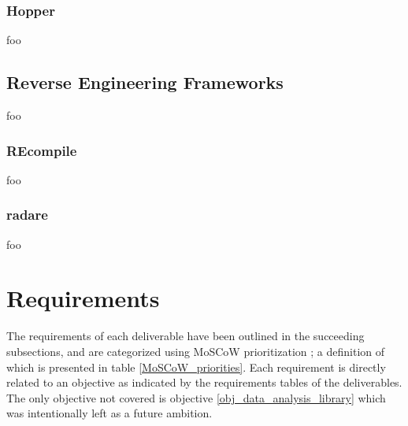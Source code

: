 \documentclass[12pt, a4paper]{article}
\begin{document}

\subsubsection{Hopper}


foo


\subsection{Reverse Engineering Frameworks}

foo


\subsubsection{REcompile}

foo

\cite{recompile}


\subsubsection{radare}

foo

\cite{radare}

\pagebreak



\section{Requirements}

The requirements of each deliverable have been outlined in the succeeding subsections, and are categorized using MoSCoW prioritization \cite{MoSCoW_analysis}; a definition of which is presented in table \ref{MoSCoW_priorities}. Each requirement is directly related to an objective as indicated by the requirements tables of the deliverables. The only objective not covered is objective \ref{obj_data_analysis_library} which was intentionally left as a future ambition.
\end{document}

